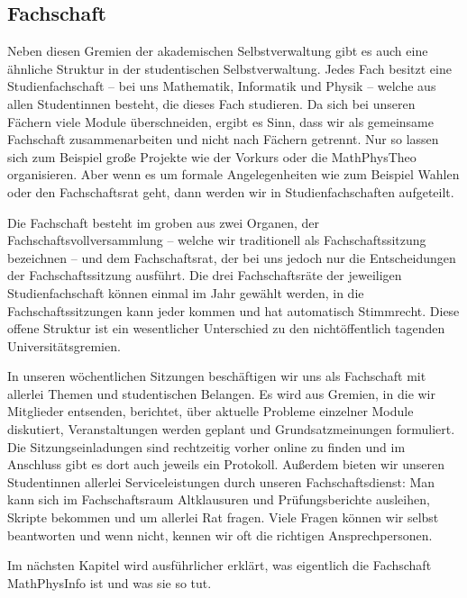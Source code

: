 \subsection{Fachschaft}
Neben diesen Gremien der akademischen Selbstverwaltung gibt es auch eine ähnliche Struktur in der studentischen Selbstverwaltung. Jedes Fach besitzt eine Studienfachschaft -- bei uns Mathematik, Informatik und Physik -- welche aus allen Studentinnen besteht, die dieses Fach studieren. Da sich bei unseren Fächern viele Module überschneiden, ergibt es Sinn, dass wir als gemeinsame Fachschaft zusammenarbeiten und nicht nach Fächern getrennt. Nur so lassen sich zum Beispiel große Projekte wie der Vorkurs oder die MathPhysTheo organisieren. Aber wenn es um formale Angelegenheiten wie zum Beispiel Wahlen oder den Fachschaftsrat geht, dann werden wir in Studienfachschaften aufgeteilt.

Die Fachschaft besteht im groben aus zwei Organen, der Fachschaftsvollversammlung -- welche wir traditionell als Fachschaftssitzung bezeichnen -- und dem Fachschaftsrat, der bei uns jedoch nur die Entscheidungen der Fachschaftssitzung ausführt. Die drei Fachschaftsräte der jeweiligen Studienfachschaft können einmal im Jahr gewählt werden, in die Fachschaftssitzungen kann jeder kommen und hat automatisch Stimmrecht. Diese offene Struktur ist ein wesentlicher Unterschied zu den nichtöffentlich tagenden Universitätsgremien.

In unseren wöchentlichen Sitzungen beschäftigen wir uns als Fachschaft mit allerlei Themen und studentischen Belangen.
Es wird aus Gremien, in die wir Mitglieder entsenden, berichtet, über aktuelle Probleme einzelner Module diskutiert, Veranstaltungen werden geplant und Grundsatzmeinungen formuliert. Die Sitzungseinladungen sind rechtzeitig vorher online zu finden und im Anschluss gibt es dort auch jeweils ein Protokoll. Außerdem bieten wir unseren Studentinnen allerlei Serviceleistungen durch unseren Fachschaftsdienst: Man kann sich im Fachschaftsraum Altklausuren und Prüfungsberichte ausleihen, Skripte bekommen und um allerlei Rat fragen. Viele Fragen können wir selbst beantworten und wenn nicht, kennen wir oft die richtigen Ansprechpersonen.

Im nächsten Kapitel wird ausführlicher erklärt, was eigentlich die Fachschaft MathPhysInfo ist und was sie so tut.

\begin{figure*}[b]
    \centering
\end{figure*}

